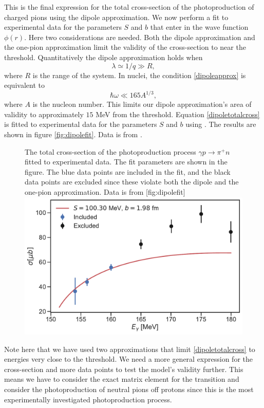 This is the final expression for the total cross-section of the photoproduction of charged pions using the dipole approximation. We now perform a fit to experimental data for the parameters $S$ and $b$ that enter in the wave function $\phi(r)$. Here two considerations are needed. Both the dipole approximation and the one-pion approximation limit the validity of the cross-section to near the threshold. Quantitatively the dipole approximation holds when 
\begin{equation}\label{dipoleapprox}
	\lambda \simeq 1/q \gg R,
\end{equation}
where $R$ is the range of the system. In nuclei, the condition \eqref{dipoleapprox} is equivalent to 
\begin{equation}\label{dipolenuc}
	\hbar \omega \ll 165 A^{1/3},
\end{equation}
where $A$ is the nucleon number. This limits our dipole approximation's area of validity to approximately $15$ MeV from the threshold. Equation \eqref{dipoletotalcross} is fitted to experimental data for the parameters $S$ and $b$ using \cite{Scipy,LMfit}. The results are shown in figure \ref{fig:dipolefit}. Data is from \cite{PionOffNeutron}.
\begin{figure}[H]
	\begin{sidecaption}{The total cross-section of the photoproduction process $\gamma p \rightarrow \pi^+ n$ fitted to experimental data. The fit parameters are shown in the figure. The blue data points are included in the fit, and the black data points are excluded since these violate both the dipole and the one-pion approximation. Data is from \cite{PionOffNeutron}}[fig:dipolefit]
		\includegraphics[width=\linewidth]{Figures/dipole_approximation.pdf}
	\end{sidecaption}
\end{figure}
Note here that we have used two approximations that limit \eqref{dipoletotalcross} to energies very close to the threshold. We need a more general expression for the cross-section and more data points to test the model's validity further. This means we have to consider the exact matrix element for the transition and consider the photoproduction of neutral pions off protons since this is the most experimentally investigated photoproduction process. 
